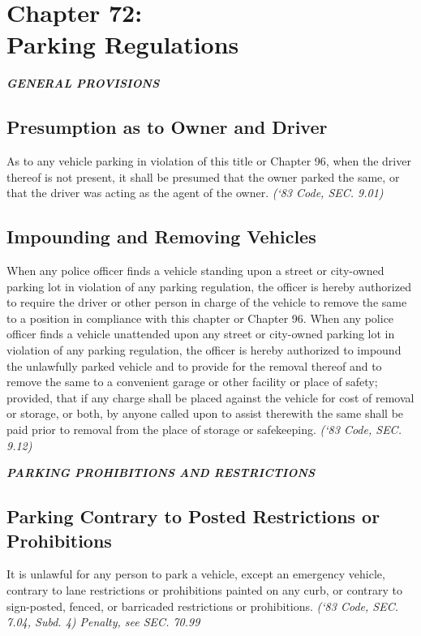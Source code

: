 \chapter*{Chapter 72: \\
	Parking Regulations}
    \minitoc
    \pagebreak


\begin{center}
\emph{\textbf{\LARGE{GENERAL PROVISIONS}}}
\end{center}

\section{Presumption as to Owner and Driver}
As to any vehicle parking in violation of this title or Chapter 96, when the driver thereof is not present, it shall be presumed that the owner parked the same, or that the driver was acting as the agent of the owner.\newline
\emph{(‘83 Code, SEC. 9.01)}

\section{Impounding and Removing Vehicles}
When any police officer finds a vehicle standing upon a street or city-owned parking lot in violation of any parking regulation, the officer is hereby authorized to require the driver or other person in charge of the vehicle to remove the same to a position in compliance with this chapter or Chapter 96. When any police officer finds a vehicle unattended upon any street or city-owned parking lot in violation of any parking regulation, the officer is hereby authorized to impound the unlawfully parked vehicle and to provide for the removal thereof and to remove the same to a convenient garage or other facility or place of safety; provided, that if any charge shall be placed against the vehicle for cost of removal or storage, or both, by anyone called upon to assist therewith the same shall be paid prior to removal from the place of storage or safekeeping.\newline
\emph{(‘83 Code, SEC. 9.12)}\newline


\begin{center}
\emph{\textbf{\LARGE{PARKING PROHIBITIONS AND RESTRICTIONS}}}
\end{center}

\setcounter{section}{14}
\section{Parking Contrary to Posted Restrictions or Prohibitions}
It is unlawful for any person to park a vehicle, except an emergency vehicle, contrary to lane restrictions or prohibitions painted on any curb, or contrary to sign-posted, fenced, or barricaded restrictions or prohibitions.\newline
\emph{(‘83 Code, SEC. 7.04, Subd. 4)  Penalty, see SEC. 70.99}

